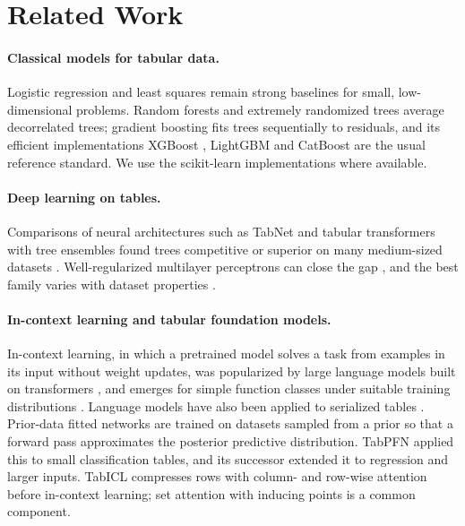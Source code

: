 \section{Related Work}
\label{sec:related}

\paragraph{Classical models for tabular data.}
Logistic regression \citep{cox1958logistic} and least squares remain strong baselines for small, low-dimensional
problems. Random forests \citep{breiman2001rf} and extremely randomized trees \citep{geurts2006extremely} average
decorrelated trees; gradient boosting \citep{friedman2001gbm} fits trees sequentially to residuals, and its efficient
implementations XGBoost \citep{chen2016xgboost}, LightGBM \citep{ke2017lightgbm} and CatBoost
\citep{prokhorenkova2018catboost} are the usual reference standard. We use the scikit-learn implementations
\citep{pedregosa2011sklearn} where available.

\paragraph{Deep learning on tables.}
Comparisons of neural architectures such as TabNet \citep{arik2021tabnet} and tabular transformers
\citep{gorishniy2021revisiting} with tree ensembles found trees competitive or superior on many medium-sized datasets
\citep{shwartzziv2022tabular,borisov2024survey,grinsztajn2022tree}. Well-regularized multilayer perceptrons can close
the gap \citep{kadra2021welltuned}, and the best family varies with dataset properties \citep{mcelfresh2023neural}.

\paragraph{In-context learning and tabular foundation models.}
In-context learning, in which a pretrained model solves a task from examples in its input without weight updates,
was popularized by large language models \citep{brown2020gpt3} built on transformers \citep{vaswani2017attention},
and emerges for simple function classes under suitable training distributions \citep{garg2022icl}. Language models
have also been applied to serialized tables \citep{hegselmann2023tabllm}. Prior-data fitted networks
\citep{muller2022pfn} are trained on datasets sampled from a prior so that a forward pass approximates the posterior
predictive distribution. TabPFN \citep{hollmann2023tabpfn} applied this to small classification tables, and its
successor \citep{hollmann2025tabpfn} extended it to regression and larger inputs. TabICL \citep{qu2025tabicl}
compresses rows with column- and row-wise attention before in-context learning; set attention with inducing points
\citep{lee2019set} is a common component.


